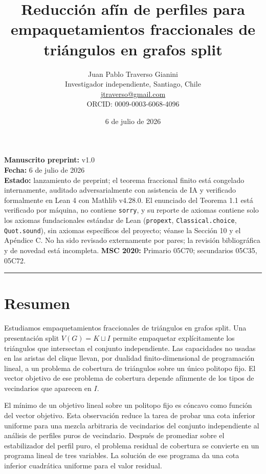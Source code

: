 \documentclass[
  11pt,
]{article}
\title{Reducción afín de perfiles para empaquetamientos fraccionales de triángulos en grafos split}
\author{Juan Pablo Traverso Gianini\\
\small Investigador independiente, Santiago, Chile\\
\small \href{mailto:jtraverso@gmail.com}{jtraverso@gmail.com}\\
\small ORCID: 0009-0003-6068-4096}
\date{6 de julio de 2026}
\begin{document}
\sloppy
\maketitle
\begin{small}\begin{raggedright}

\textbf{Manuscrito preprint:} v1.0\\
\textbf{Fecha:} 6 de julio de 2026\\
\textbf{Estado:} lanzamiento de preprint; el teorema fraccional finito
está congelado internamente, auditado adversarialmente con asistencia de
IA y verificado formalmente en Lean 4 con Mathlib v4.28.0. El enunciado
del Teorema 1.1 está verificado por máquina, no contiene \texttt{sorry},
y su reporte de axiomas contiene solo los axiomas fundacionales estándar
de Lean (\texttt{propext}, \texttt{Classical.choice},
\texttt{Quot.sound}), sin axiomas específicos del proyecto; véanse la
Sección 10 y el Apéndice C. No ha sido revisado externamente por pares;
la revisión bibliográfica y de novedad está incompleta. \textbf{MSC
2020:} Primario 05C70; secundarios 05C35, 05C72.

\begin{center}\rule{0.5\linewidth}{0.5pt}\end{center}

\end{raggedright}\end{small}

\section{Resumen}\label{resumen}

Estudiamos empaquetamientos fraccionales de triángulos en grafos split.
Una presentación split \(V(G)=K\sqcup I\) permite empaquetar
explícitamente los triángulos que intersectan el conjunto independiente.
Las capacidades no usadas en las aristas del clique llevan, por dualidad
finito-dimensional de programación lineal, a un problema de cobertura de
triángulos sobre un único politopo fijo. El vector objetivo de ese
problema de cobertura depende afínmente de los tipos de vecindarios que
aparecen en \(I\).

El mínimo de un objetivo lineal sobre un politopo fijo es cóncavo como
función del vector objetivo. Esta observación reduce la tarea de probar
una cota inferior uniforme para una mezcla arbitraria de vecindarios del
conjunto independiente al análisis de perfiles puros de vecindario.
Después de promediar sobre el estabilizador del perfil puro, el problema
residual de cobertura se convierte en un programa lineal de tres
variables. La solución de ese programa da una cota inferior cuadrática
uniforme para el valor residual.
\end{document}
